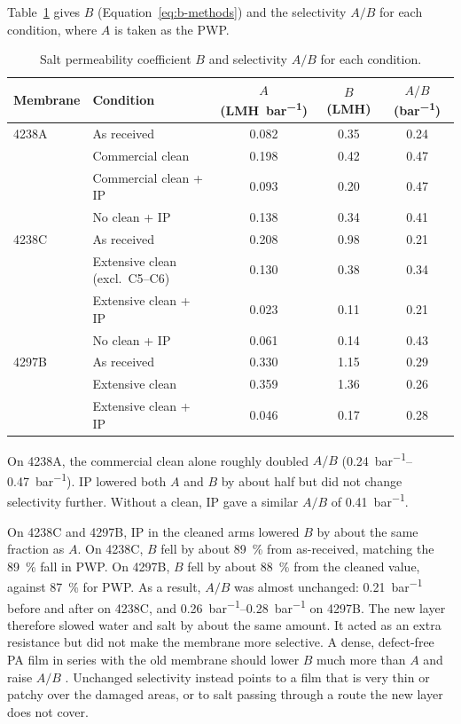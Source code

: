 Table~\ref{tab:ip-B} gives $B$ (Equation~\ref{eq:b-methods}) and the selectivity $A/B$ for each condition, where $A$ is taken as the PWP.

\begin{table}[htbp]
\centering
\caption{Salt permeability coefficient $B$ and selectivity $A/B$ for each condition. }
\label{tab:ip-B}
\small
\begin{tabular}{llccc}
    \toprule
    Membrane & Condition & $A$ (\unit{LMH.bar^{-1}}) & $B$ (\unit{LMH}) & $A/B$ (\unit{bar^{-1}}) \\
    \midrule
    4238A & As received & 0.082 & 0.35 & 0.24 \\
    & Commercial clean & 0.198 & 0.42 & 0.47 \\
    & Commercial clean + IP & 0.093 & 0.20 & 0.47 \\
    & No clean + IP & 0.138 & 0.34 & 0.41 \\
    \midrule
    4238C & As received & 0.208 & 0.98 & 0.21 \\
    & Extensive clean (excl.\ C5--C6) & 0.130 & 0.38 & 0.34 \\
    & Extensive clean + IP & 0.023 & 0.11 & 0.21 \\
    & No clean + IP & 0.061 & 0.14 & 0.43 \\
    \midrule
    4297B & As received & 0.330 & 1.15 & 0.29 \\
    & Extensive clean & 0.359 & 1.36 & 0.26 \\
    & Extensive clean + IP & 0.046 & 0.17 & 0.28 \\
    \bottomrule
  \end{tabular}
\end{table}

\iffalse
On 4238A, the commercial clean alone roughly doubled $A/B$ (\qtyrange{0.24}{0.47}{bar^{-1}}). IP lowered both $A$ and $B$ by about half but did not change selectivity further. Without a clean, IP gave a similar $A/B$ of \qty{0.41}{bar^{-1}}.

On 4238C and 4297B, IP in the cleaned arms lowered $B$ by about the same fraction as $A$. On 4238C, $B$ fell by about \qty{89}{\percent} from as-received, matching the \qty{89}{\percent} fall in PWP. On 4297B, $B$ fell by about \qty{88}{\percent} from the cleaned value, against \qty{87}{\percent} for PWP. As a result, $A/B$ was almost unchanged: \qty{0.21}{bar^{-1}} before and after on 4238C, and \qtyrange{0.26}{0.28}{bar^{-1}} on 4297B. The new layer therefore slowed water and salt by about the same amount. It acted as an extra resistance but did not make the membrane more selective. A dense, defect-free PA film in series with the old membrane should lower $B$ much more than $A$ and raise $A/B$ . Unchanged selectivity instead points to a film that is very thin or patchy over the damaged areas, or to salt passing through a route the new layer does not cover.

